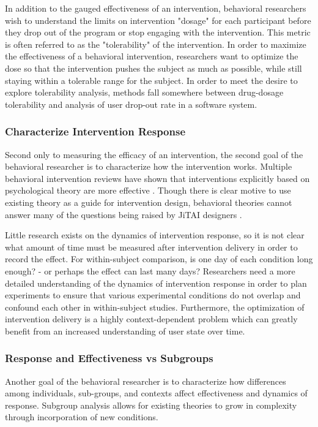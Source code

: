\documentclass[review,journal]{vgtc}         %
\begin{document}
In addition to the gauged effectiveness of an intervention, behavioral researchers wish to understand the limits on intervention "dosage" for each participant before they drop out of the program or stop engaging with the intervention.
This metric is often referred to as the "tolerability" of the intervention.
In order to maximize the effectiveness of a behavioral intervention, researchers want to optimize the dose so that the intervention pushes the subject as much as possible, while still staying within a tolerable range for the subject.
In order to meet the desire to explore tolerability analysis, methods fall somewhere between drug-dosage tolerability and analysis of user drop-out rate in a software system.


\subsubsection{Characterize Intervention Response}
Second only to measuring the efficacy of an intervention, the second goal of the behavioral researcher is to characterize how the intervention works.
Multiple behavioral intervention reviews have shown that interventions explicitly based on psychological theory are more effective \cite{glanz2010}.
Though there is clear motive to use existing theory as a guide for intervention design, behavioral theories cannot answer many of the questions being raised by JiTAI designers \cite{riley2011}.

Little research exists on the dynamics of intervention response, so it is not clear what amount of time must be measured after intervention delivery in order to record the effect.
For within-subject comparison, is one day of each condition long enough? - or perhaps the effect can last many days?
Researchers need a more detailed understanding of the dynamics of intervention response in order to plan experiments to ensure that various experimental conditions do not overlap and confound each other in within-subject studies.
Furthermore, the optimization of intervention delivery is a highly context-dependent problem which can greatly benefit from an increased understanding of user state over time.

\subsubsection{Response and Effectiveness vs Subgroups}
Another goal of the behavioral researcher is to characterize how differences among individuals, sub-groups, and contexts affect effectiveness and dynamics of response.
Subgroup analysis allows for existing theories to grow in complexity through incorporation of new conditions.
\end{document}
